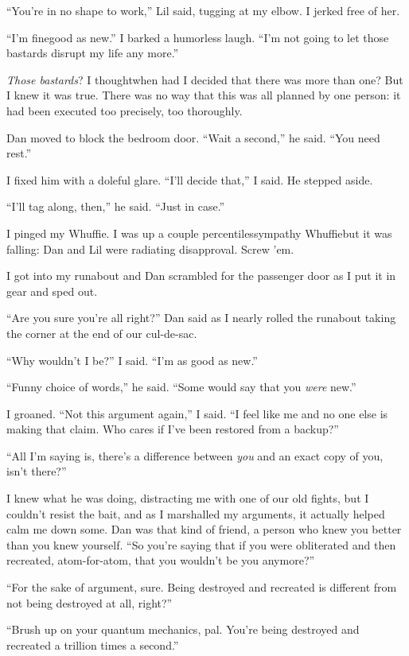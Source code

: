 “You're in no shape to work,” Lil said, tugging at my elbow. I
jerked free of her.

“I'm fine{\dash}good as new.” I barked a humorless laugh. “I'm not going
to let those bastards disrupt my life any more.”

\emph{Those bastards}? I thought{\dash}when had I decided that there was
more than one? But I knew it was true. There was no way that this
was all planned by one person: it had been executed too precisely,
too thoroughly.

Dan moved to block the bedroom door. “Wait a second,” he said. “You
need rest.”

I fixed him with a doleful glare. “I'll decide that,” I said. He
stepped aside.

“I'll tag along, then,” he said. “Just in case.”

I pinged my Whuffie. I was up a couple percentiles{\dash}sympathy
Whuffie{\dash}but it was falling: Dan and Lil were radiating disapproval.
Screw 'em.

I got into my runabout and Dan scrambled for the passenger door as
I put it in gear and sped out.

“Are you sure you're all right?” Dan said as I nearly rolled the
runabout taking the corner at the end of our cul-de-sac.

“Why wouldn't I be?” I said. “I'm as good as new.”

“Funny choice of words,” he said. “Some would say that you
\emph{were} new.”

I groaned. “Not this argument again,” I said. “I feel like me and
no one else is making that claim. Who cares if I've been restored
from a backup?”

“All I'm saying is, there's a difference between \emph{you} and an
exact copy of you, isn't there?”

I knew what he was doing, distracting me with one of our old
fights, but I couldn't resist the bait, and as I marshalled my
arguments, it actually helped calm me down some. Dan was that kind
of friend, a person who knew you better than you knew yourself. “So
you're saying that if you were obliterated and then recreated,
atom-for-atom, that you wouldn't be you anymore?”

“For the sake of argument, sure. Being destroyed and recreated is
different from not being destroyed at all, right?”

“Brush up on your quantum mechanics, pal. You're being destroyed
and recreated a trillion times a second.”

